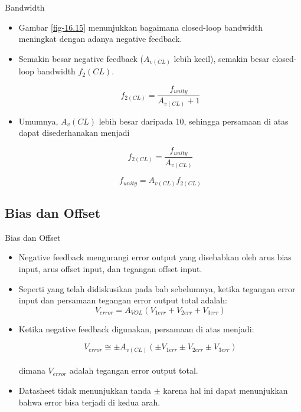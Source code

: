 \begin{frame}{Bandwidth}
	\begin{itemize}
		\item Gambar \ref{fig-16.15} menunjukkan bagaimana closed-loop bandwidth meningkat dengan adanya negative feedback.
		\item Semakin besar negative feedback ($ A_{v(CL)} $ lebih kecil), semakin besar closed-loop bandwidth $ f_2(CL) $.

		\begin{equation*}
			f_{2(CL)} = \frac{f_{unity}}{A_{v(CL)} + 1}
		\end{equation*}
		
		\item Umumnya, $ A_v(CL) $ lebih besar daripada 10, sehingga persamaan di atas dapat disederhanakan menjadi
		
		\begin{equation}\label{pers.16.05}
			f_{2(CL)} = \frac{f_{unity}}{A_{v(CL)}}
		\end{equation}
	
		\begin{equation}\label{pers.16.06}
			f_{unity} = A_{v(CL)}f_{2(CL)}
		\end{equation}
	\end{itemize}
\end{frame}

\subsection{Bias dan Offset}

\begin{frame}{Bias dan Offset}
	\begin{itemize}
		\item Negative feedback mengurangi error output yang disebabkan oleh arus bias input, arus offset input, dan tegangan offset input.
		\item Seperti yang telah didiskusikan pada bab sebelumnya, ketika tegangan error input dan persamaan tegangan error output total adalah:\\

		\[ V_{error} = A_{VOL} (V_{1err} + V_{2err} + V_{3err}) \]

		\item Ketika negative feedback digunakan, persamaan di atas menjadi:

		\begin{equation}\label{pers.16.07}
			V_{error} \cong \pm A_{v(CL)} ( \pm V_{1err} \pm V_{2err} \pm V_{3err} )
		\end{equation}
		\\
		dimana $ V_{error} $ adalah tegangan error output total.
		\item Datasheet tidak menunjukkan tanda $ \pm $ karena hal ini dapat menunjukkan bahwa error bisa terjadi di kedua arah.
	\end{itemize}
\end{frame}

